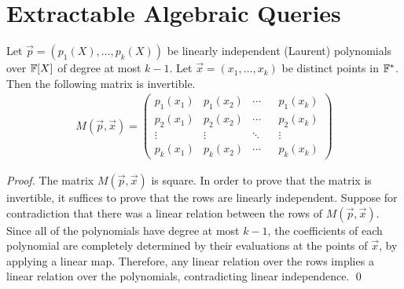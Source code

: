 \section{Extractable Algebraic Queries}

\begin{lemma}\label{lem:matinv}
Let $\vec{p} = (p_1(X),\ldots,p_k(X))$ be linearly independent (Laurent) polynomials over $\mathbb{F}[X]$ of degree at most $k-1$. Let $\vec{x} = (x_1,\ldots,x_k)$ be distinct points in $\mathbb{F}^*$. Then the following matrix is invertible.
\begin{align*}
M(\vec{p},\vec{x}) =
\left(
\begin{array}{lllll}
p_1(x_1) & p_1(x_2) & \cdots & & p_1(x_k) \\
p_2(x_1) & p_2(x_2) & \cdots & & p_2(x_k) \\
\vdots & \vdots &  \ddots & & \vdots \\
p_k(x_1) & p_k(x_2) & \cdots & & p_k(x_k)
\end{array}
\right)
\end{align*}
\end{lemma}

\begin{proof}
The matrix $M(\vec{p},\vec{x})$ is square. In order to prove that the matrix is invertible, it suffices to prove that the rows are linearly independent. Suppose for contradiction that there was a linear relation between the rows of $M(\vec{p},\vec{x})$. Since all of the polynomials have degree at most $k-1$, the coefficients of each polynomial are completely determined by their evaluations at the points of $\vec{x}$, by applying a linear map. Therefore, any linear relation over the rows implies a linear relation over the polynomials, contradicting linear independence. \qed
\end{proof}


